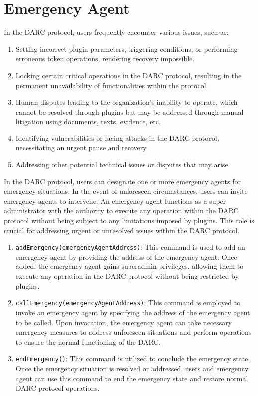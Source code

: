 \documentclass[main.tex]{subfiles}
\begin{document}
\section{Emergency Agent}

In the DARC protocol, users frequently encounter various issues, such as:

\begin{enumerate}
    \item Setting incorrect plugin parameters, triggering conditions, or performing erroneous token operations, rendering recovery impossible.
    \item Locking certain critical operations in the DARC protocol, resulting in the permanent unavailability of functionalities within the protocol.
    \item Human disputes leading to the organization's inability to operate, which cannot be resolved through plugins but may be addressed through manual litigation using documents, texts, evidence, etc.
    \item Identifying vulnerabilities or facing attacks in the DARC protocol, necessitating an urgent pause and recovery.
    \item Addressing other potential technical issues or disputes that may arise.
\end{enumerate}

In the DARC protocol, users can designate one or more emergency agents for emergency situations. In the event of unforeseen circumstances, users can invite emergency agents to intervene. An emergency agent functions as a super administrator with the authority to execute any operation within the DARC protocol without being subject to any limitations imposed by plugins. This role is crucial for addressing urgent or unresolved issues within the DARC protocol.

\begin{enumerate}
    \item \texttt{addEmergency(emergencyAgentAddress)}: This command is used to add an emergency agent by providing the address of the emergency agent. Once added, the emergency agent gains superadmin privileges, allowing them to execute any operation in the DARC protocol without being restricted by plugins.

    \item \texttt{callEmergency(emergencyAgentAddress)}: This command is employed to invoke an emergency agent by specifying the address of the emergency agent to be called. Upon invocation, the emergency agent can take necessary emergency measures to address unforeseen situations and perform operations to ensure the normal functioning of the DARC.

    \item \texttt{endEmergency()}: This command is utilized to conclude the emergency state. Once the emergency situation is resolved or addressed, users and emergency agent can use this command to end the emergency state and restore normal DARC protocol operations.
\end{enumerate}
\end{document}
